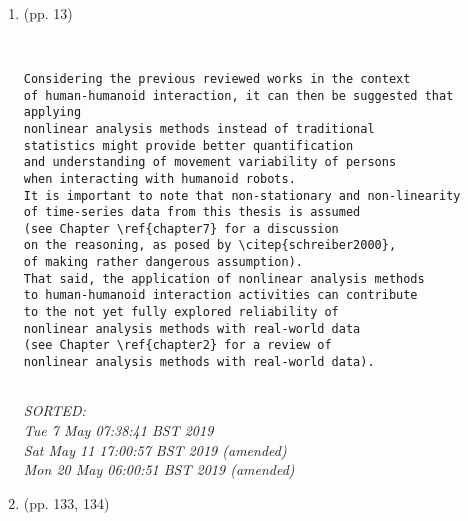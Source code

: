 \documentclass[12pt]{article}
\begin{document}
\begin{enumerate}

\item  (pp. 13)   

	\begin{verbatim}


Considering the previous reviewed works in the context 
of human-humanoid interaction, it can then be suggested that applying 
nonlinear analysis methods instead of traditional 
statistics might provide better quantification 
and understanding of movement variability of persons 
when interacting with humanoid robots.
It is important to note that non-stationary and non-linearity 
of time-series data from this thesis is assumed 
(see Chapter \ref{chapter7} for a discussion
on the reasoning, as posed by \citep{schreiber2000},
of making rather dangerous assumption).
That said, the application of nonlinear analysis methods 
to human-humanoid interaction activities can contribute 
to the not yet fully explored reliability of 
nonlinear analysis methods with real-world data 
(see Chapter \ref{chapter2} for a review of 
nonlinear analysis methods with real-world data).


	\end{verbatim}
	\textit{
	SORTED: \\ 
	Tue  7 May 07:38:41 BST 2019 \\
	Sat May 11 17:00:57 BST 2019 (amended) \\
	Mon 20 May 06:00:51 BST 2019 (amended)
	}
	\\


\item  (pp. 133, 134)   




\end{enumerate}
\end{document}
